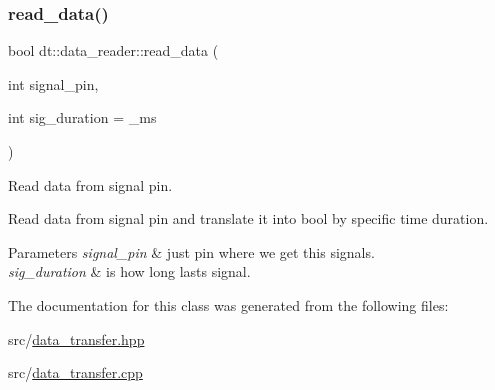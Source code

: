\subsubsection{\texorpdfstring{read\+\_\+data()}{read\_data()}}
{\footnotesize\ttfamily bool dt\+::data\+\_\+reader\+::read\+\_\+data (\begin{DoxyParamCaption}\item[{int}]{signal\+\_\+pin,  }\item[{int}]{sig\+\_\+duration = {\+\_\+ms} }\end{DoxyParamCaption})}



Read data from signal pin. 

Read data from signal pin and translate it into bool by specific time duration.


\begin{DoxyParams}{Parameters}
{\em signal\+\_\+pin} & just pin where we get this signals. \\
\hline
{\em sig\+\_\+duration} & is how long lasts signal. \\
\hline
\end{DoxyParams}


The documentation for this class was generated from the following files\+:\begin{DoxyCompactItemize}
\item 
src/\hyperlink{data__transfer_8hpp}{data\+\_\+transfer.\+hpp}\item 
src/\hyperlink{data__transfer_8cpp}{data\+\_\+transfer.\+cpp}\end{DoxyCompactItemize}
